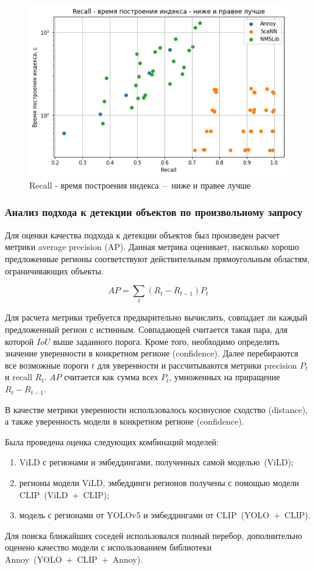 \documentclass[a4paper,14pt]{article}
\begin{document}
    \begin{figure}[H]
        \centering
        \includegraphics[width=0.7\linewidth]{images/ann_recall_build}
        \caption{Recall - время построения индекса~--~ниже и правее лучше}
        \label{fig:ann_recall_build}
    \end{figure}

    \subsubsection{Анализ подхода к детекции объектов по произвольному запросу} \label{fsod_exp}

    Для оценки качества подхода к детекции объектов был произведен расчет метрики average precision (AP).
    Данная метрика оценивает, насколько хорошо предложенные регионы соответствуют действительным прямоугольным областям, ограничивающих объекты.

    $$ AP = \sum_{t} (R_t - R_{t - 1}) P_t $$

    Для расчета метрики требуется предварительно вычислить, совпадает ли каждый предложенный регион с истинным.
    Совпадающей считается такая пара, для которой $IoU$ выше заданного порога.
    Кроме того, необходимо определить значение уверенности в конкретном регионе (confidence).
    Далее перебираются все возможные пороги $t$ для уверенности и рассчитываются метрики precision $P_t$ и recall $R_t$.
    $AP$ считается как сумма всех $P_t$, умноженных на приращение $R_t - R_{t - 1}$.

    В качестве метрики уверенности использовалось косинусное сходство (distance), а также уверенность модели в конкретном регионе (confidence).

    Была проведена оценка следующих комбинаций моделей:
    \begin{enumerate}
        [1)]
        \itemsep0em
        \item ViLD с регионами и эмбеддингами, полученных самой моделью~(ViLD);
        \item регионы модели ViLD, эмбеддинги регионов получены с помощью модели CLIP~(ViLD~+~CLIP);
        \item модель с регионами от YOLOv5 и эмбеддингами от CLIP~(YOLO~+~CLIP).
    \end{enumerate}
    Для поиска ближайших соседей использовался полный перебор, дополнительно оценено качество модели с использованием библиотеки Annoy~(YOLO~+~CLIP~+~Annoy).
\end{document}
